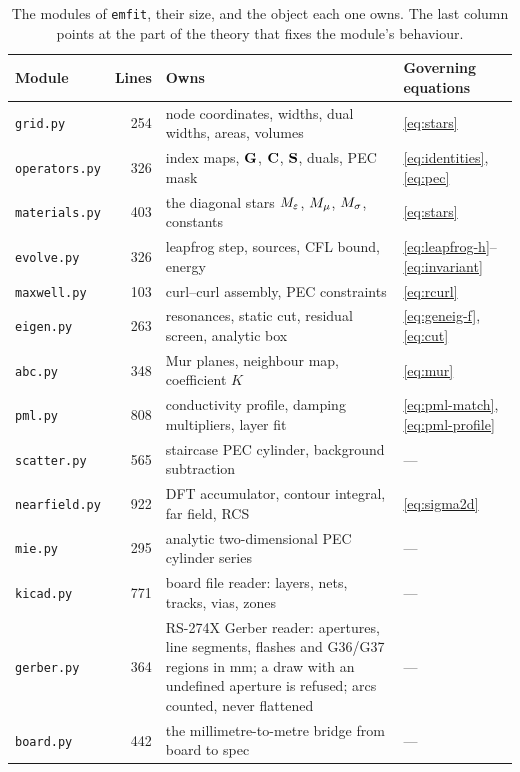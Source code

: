\begin{table}[H]
  \centering
  \caption{The modules of \texttt{emfit}, their size, and the object each one owns. The last column points at
  the part of the theory that fixes the module's behaviour.}
  \label{tab:modules}
  \small
  \begin{tabular}{@{}l r p{7.0cm} p{3.6cm}@{}}
    \toprule
    Module & Lines & Owns & Governing equations \\
    \midrule
    \texttt{grid.py}       & 254  & node coordinates, widths, dual widths, areas, volumes & \eqref{eq:stars} \\
    \texttt{operators.py}  & 326  & index maps, $\mathbf{G}$, $\mathbf{C}$, $\mathbf{S}$, duals, PEC mask & \eqref{eq:identities}, \eqref{eq:pec} \\
    \texttt{materials.py}  & 403  & the diagonal stars ${M_{\varepsilon}}$, ${M_{\mu}}$, ${M_{\sigma}}$, constants & \eqref{eq:stars} \\
    \texttt{evolve.py}     & 326  & leapfrog step, sources, CFL bound, energy & \eqref{eq:leapfrog-h}--\eqref{eq:invariant} \\
    \texttt{maxwell.py}    & 103  & curl--curl assembly, PEC constraints & \eqref{eq:rcurl} \\
    \texttt{eigen.py}      & 263  & resonances, static cut, residual screen, analytic box & \eqref{eq:geneig-f}, \eqref{eq:cut} \\
    \texttt{abc.py}        & 348  & Mur planes, neighbour map, coefficient $K$ & \eqref{eq:mur} \\
    \texttt{pml.py}        & 808  & conductivity profile, damping multipliers, layer fit & \eqref{eq:pml-match}, \eqref{eq:pml-profile} \\
    \texttt{scatter.py}    & 565  & staircase PEC cylinder, background subtraction & --- \\
    \texttt{nearfield.py}  & 922  & DFT accumulator, contour integral, far field, RCS & \eqref{eq:sigma2d} \\
    \texttt{mie.py}        & 295  & analytic two-dimensional PEC cylinder series & --- \\
    \texttt{kicad.py}      & 771  & board file reader: layers, nets, tracks, vias, zones & --- \\
    \texttt{gerber.py}     & 364  & RS-274X Gerber reader: apertures, line segments, flashes and G36/G37 regions in mm; a draw with an undefined aperture is refused; arcs counted, never flattened & --- \\
    \texttt{board.py}      & 442  & the millimetre-to-metre bridge from board to spec & --- \\

\end{tabular}
\end{table}
